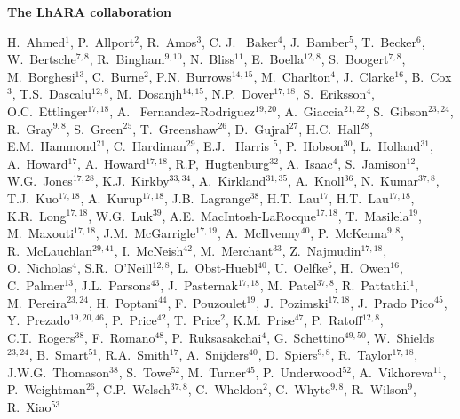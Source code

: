 \vspace{0.75cm}
\begin{center}
  {\bf \color{BlueViolet} The LhARA collaboration} \\
  \vspace{0.25cm}
\end{center}
\begin{center}
  H.~Ahmed$^{1}$,
  P.~Allport$^{2}$,
  R.~Amos$^{3}$,
  C. J. ~Baker$^{4}$,
  J.~Bamber$^{5}$,
  T.~Becker$^{6}$,
  W.~Bertsche$^{7,8}$,
  R.~Bingham$^{9,10}$,
  N.~Bliss$^{11}$,
  E.~Boella$^{12,8}$,
  S.~Boogert$^{7,8}$,
  M.~Borghesi$^{13}$,
  C.~Burne$^{2}$,
  P.N.~Burrows$^{14,15}$,
  M.~Charlton$^{4}$,
  J.~Clarke$^{16}$,
  B.~Cox$^{3}$,
  T.S.~Dascalu$^{12,8}$,
  M.~Dosanjh$^{14,15}$,
  N.P.~Dover$^{17,18}$,
  S.~Eriksson$^{4}$,
  O.C.~Ettlinger$^{17,18}$,
  A. ~Fernandez-Rodriguez$^{19,20}$,
  A.~Giaccia$^{21,22}$,
  S.~Gibson$^{23,24}$,
  R.~Gray$^{9,8}$,
  S.~Green$^{25}$,
  T.~Greenshaw$^{26}$,
  D.~Gujral$^{27}$,
  H.C.~Hall$^{28}$,
  E.M.~Hammond$^{21}$,
  C.~Hardiman$^{29}$,
  E.J. ~Harris $^{5}$,
  P.~Hobson$^{30}$,
  L.~Holland$^{31}$,
  A.~Howard$^{17}$,
  A.~Howard$^{17,18}$,
  R.P,~Hugtenburg$^{32}$,
  A.~Isaac$^{4}$,
  S.~Jamison$^{12}$,
  W.G.~Jones$^{17,28}$,
  K.J.~Kirkby$^{33,34}$,
  A.~Kirkland$^{31,35}$,
  A.~Knoll$^{36}$,
  N.~Kumar$^{37,8}$,
  T.J.~Kuo$^{17,18}$,
  A.~Kurup$^{17,18}$,
  J.B.~Lagrange$^{38}$,
  H.T.~Lau$^{17}$,
  H.T.~Lau$^{17,18}$,
  K.R.~Long$^{17,18}$,
  W.G.~Luk$^{39}$,
  A.E.~MacIntosh-LaRocque$^{17,18}$,
  T.~Masilela$^{19}$,
  M.~Maxouti$^{17,18}$,
  J.M.~McGarrigle$^{17,19}$,
  A.~McIlvenny$^{40}$,
  P.~McKenna$^{9,8}$,
  R.~McLauchlan$^{29,41}$,
  I.~McNeish$^{42}$,
  M.~Merchant$^{33}$,
  Z.~Najmudin$^{17,18}$,
  O.~Nicholas$^{4}$,
  S.R.~O'Neill$^{12,8}$,
  L.~Obst-Huebl$^{40}$,
  U.~Oelfke$^{5}$,
  H.~Owen$^{16}$,
  C.~Palmer$^{13}$,
  J.L.~Parsons$^{43}$,
  J.~Pasternak$^{17,18}$,
  M.~Patel$^{37,8}$,
  R.~Pattathil$^{1}$,
  M.~Pereira$^{23,24}$,
  H.~Poptani$^{44}$,
  F.~Pouzoulet$^{19}$,
  J.~Pozimski$^{17,18}$,
  J.~Prado Pico$^{45}$,
  Y.~Prezado$^{19,20,46}$,
  P.~Price$^{42}$,
  T.~Price$^{2}$,
  K.M.~Prise$^{47}$,
  P.~Ratoff$^{12,8}$,
  C.T.~Rogers$^{38}$,
  F.~Romano$^{48}$,
  P.~Ruksasakchai$^{4}$,
  G.~Schettino$^{49,50}$,
  W.~Shields$^{23,24}$,
  B.~Smart$^{51}$,
  R.A.~Smith$^{17}$,
  A.~Snijders$^{40}$,
  D.~Spiers$^{9,8}$,
  R.~Taylor$^{17,18}$,
  J.W.G.~Thomason$^{38}$,
  S.~Towe$^{52}$,
  M.~Turner$^{45}$,
  P.~Underwood$^{52}$,
  A.~Vikhoreva$^{11}$,
  P.~Weightman$^{26}$,
  C.P.~Welsch$^{37,8}$,
  C.~Wheldon$^{2}$,
  C.~Whyte$^{9,8}$,
  R.~Wilson$^{9}$,
  R.~Xiao$^{53}$
\end{center}
